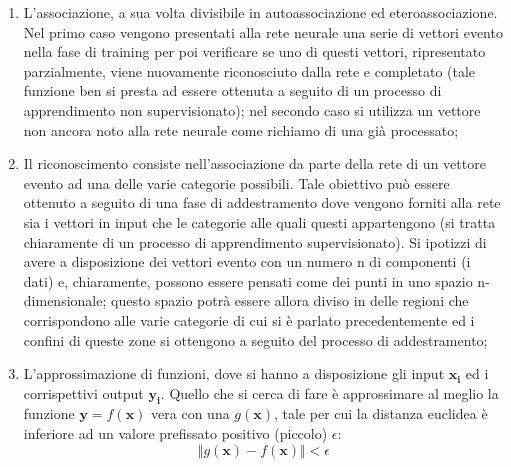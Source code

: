 \begin{enumerate}
	\item L'associazione, a sua volta divisibile in autoassociazione ed eteroassociazione. Nel primo caso vengono presentati alla rete neurale una serie di vettori evento nella fase di training per poi verificare se uno di questi vettori, ripresentato parzialmente, viene nuovamente riconosciuto dalla rete e completato (tale funzione ben si presta ad essere ottenuta a seguito di un processo di apprendimento non supervisionato); nel secondo caso si utilizza un vettore non ancora noto alla rete neurale come richiamo di una già processato;
	\item Il riconoscimento consiste nell'associazione da parte della rete di un vettore evento ad una delle varie categorie possibili. Tale obiettivo può essere ottenuto a seguito di una fase di addestramento dove vengono forniti alla rete sia i vettori in input che le categorie alle quali questi appartengono (si tratta chiaramente di un processo di apprendimento supervisionato). Si ipotizzi di avere a disposizione dei vettori evento con un numero n di componenti (i dati) e, chiaramente, possono essere pensati come dei punti in uno spazio n-dimensionale; questo spazio potrà essere allora diviso in delle regioni che corrispondono alle varie categorie di cui si è parlato precedentemente ed i confini di queste zone si ottengono a seguito del processo di addestramento;
	\item L'approssimazione di funzioni, dove si hanno a disposizione gli input $\textbf{x}_\textbf{i}$ ed i corrispettivi output $\textbf{y}_\textbf{i}$. Quello che si cerca di fare è approssimare al meglio la funzione $\textbf{y} = f(\textbf{x})$ vera con una $g(\textbf{x})$, tale per cui la distanza euclidea è inferiore ad un valore prefissato positivo (piccolo) $\epsilon$:
	\begin{equation}
	\Vert g(\textbf{x}) - f(\textbf{x}) \Vert < \epsilon
	\end{equation}
\end{enumerate}

